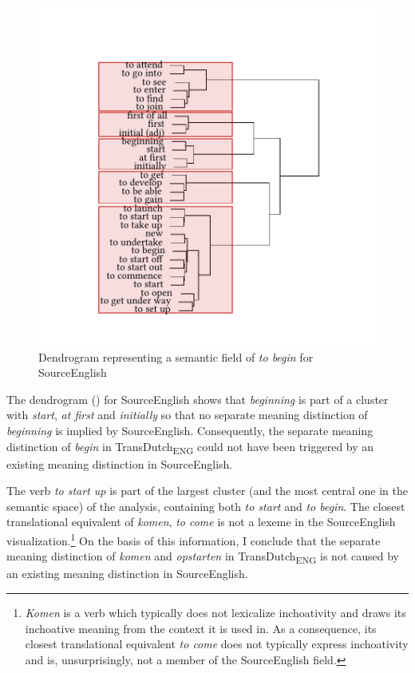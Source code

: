 \begin{figure}
\includegraphics[width=\textwidth]{figures/tree90.pdf}
\caption{\label{fig:4:87}Dendrogram representing a semantic field of \textit{to begin} for SourceEnglish}
\end{figure}

The dendrogram () for SourceEnglish shows that \textit{beginning} is part of a cluster with \textit{start}, \textit{at first} and \textit{initially} so that no separate meaning distinction of \textit{beginning} is implied by SourceEnglish. Consequently, the separate meaning distinction of \textit{begin} in TransDutch\textsubscript{ENG} could not have been triggered by an existing meaning distinction in SourceEnglish.

The verb \textit{to start up} is part of the largest cluster (and the most central one in the semantic space) of the analysis, containing both \textit{to start} and \textit{to begin}. The closest translational equivalent of \textit{komen}, \textit{to come} is not a lexeme in the SourceEnglish visualization.\footnote{\textit{Komen} is a verb which typically does not lexicalize inchoativity and draws its inchoative meaning from the context it is used in. As a consequence, its closest translational equivalent \textit{to come} does not typically express inchoativity and is, unsurprisingly, not a member of the SourceEnglish field.} On the basis of this information, I conclude that the separate meaning distinction of \textit{komen} and \textit{opstarten} in TransDutch\textsubscript{ENG} is not caused by an existing meaning distinction in SourceEnglish.

